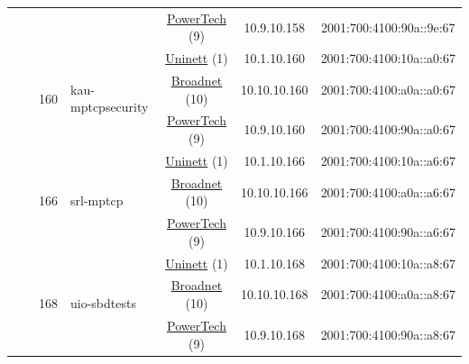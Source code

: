 \begin{small}
\begin{center}
\begin{longtable}{|c|c|c|c|c|c|c|c|}
  &  &  &  & \multicolumn{2}{|c|}{\tiny{\href{http://www.powertech.no}{PowerTech} (9)}} & \tiny{10.9.10.158} & \tiny{2001:700:4100:90a::9e:67} \\* \cline{3-3}\cline{4-4}\cline{5-5}\cline{6-6}\cline{7-7}\cline{8-8}
  &  & \multirow{3}{*}{\tiny{160}} & \multicolumn{1}{|l|}{\multirow{3}{*}{\tiny{kau-mptcpsecurity}}} & \multicolumn{2}{|c|}{\tiny{\href{https://www.uninett.no}{Uninett} (1)}} & \tiny{10.1.10.160} & \tiny{2001:700:4100:10a::a0:67} \\* \cline{5-5}\cline{6-6}\cline{7-7}\cline{8-8}
  &  &  &  & \multicolumn{2}{|c|}{\tiny{\href{https://www.broadnet.no}{Broadnet} (10)}} & \tiny{10.10.10.160} & \tiny{2001:700:4100:a0a::a0:67} \\* \cline{5-5}\cline{6-6}\cline{7-7}\cline{8-8}
  &  &  &  & \multicolumn{2}{|c|}{\tiny{\href{http://www.powertech.no}{PowerTech} (9)}} & \tiny{10.9.10.160} & \tiny{2001:700:4100:90a::a0:67} \\* \cline{3-3}\cline{4-4}\cline{5-5}\cline{6-6}\cline{7-7}\cline{8-8}
  &  & \multirow{3}{*}{\tiny{166}} & \multicolumn{1}{|l|}{\multirow{3}{*}{\tiny{srl-mptcp}}} & \multicolumn{2}{|c|}{\tiny{\href{https://www.uninett.no}{Uninett} (1)}} & \tiny{10.1.10.166} & \tiny{2001:700:4100:10a::a6:67} \\* \cline{5-5}\cline{6-6}\cline{7-7}\cline{8-8}
  &  &  &  & \multicolumn{2}{|c|}{\tiny{\href{https://www.broadnet.no}{Broadnet} (10)}} & \tiny{10.10.10.166} & \tiny{2001:700:4100:a0a::a6:67} \\* \cline{5-5}\cline{6-6}\cline{7-7}\cline{8-8}
  &  &  &  & \multicolumn{2}{|c|}{\tiny{\href{http://www.powertech.no}{PowerTech} (9)}} & \tiny{10.9.10.166} & \tiny{2001:700:4100:90a::a6:67} \\* \cline{3-3}\cline{4-4}\cline{5-5}\cline{6-6}\cline{7-7}\cline{8-8}
  &  & \multirow{3}{*}{\tiny{168}} & \multicolumn{1}{|l|}{\multirow{3}{*}{\tiny{uio-sbdtests}}} & \multicolumn{2}{|c|}{\tiny{\href{https://www.uninett.no}{Uninett} (1)}} & \tiny{10.1.10.168} & \tiny{2001:700:4100:10a::a8:67} \\* \cline{5-5}\cline{6-6}\cline{7-7}\cline{8-8}
  &  &  &  & \multicolumn{2}{|c|}{\tiny{\href{https://www.broadnet.no}{Broadnet} (10)}} & \tiny{10.10.10.168} & \tiny{2001:700:4100:a0a::a8:67} \\* \cline{5-5}\cline{6-6}\cline{7-7}\cline{8-8}
  &  &  &  & \multicolumn{2}{|c|}{\tiny{\href{http://www.powertech.no}{PowerTech} (9)}} & \tiny{10.9.10.168} & \tiny{2001:700:4100:90a::a8:67} \\* \cline{3-3}\cline{4-4}\cline{5-5}\cline{6-6}\cline{7-7}\cline{8-8}

\end{longtable}
\end{center}
\end{small}
